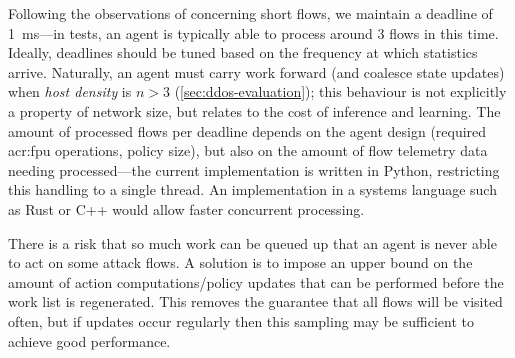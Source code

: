 Following the observations of \Textcite{DBLP:conf/sigcomm/ChenL0L18} concerning short flows, we maintain a deadline of \qty{1}{\milli\second}---in tests, an agent is typically able to process around \num{3} flows in this time.
Ideally, deadlines should be tuned based on the frequency at which statistics arrive.
Naturally, an agent must carry work forward (and coalesce state updates) when \emph{host density} is $n>3$ (\cref{sec:ddos-evaluation}); this behaviour is not explicitly a property of network size, but relates to the cost of inference and learning.
The amount of processed flows per deadline depends on the agent design (required \gls{acr:fpu} operations, policy size), but also on the amount of flow telemetry data needing processed---the current implementation is written in Python, restricting this handling to a single thread.
An implementation in a systems language such as Rust or C++ would allow faster concurrent processing.

There is a risk that so much work can be queued up that an agent is never able to act on some attack flows.
A solution is to impose an upper bound on the amount of action computations/policy updates that can be performed before the work list is regenerated.
This removes the guarantee that all flows will be visited often, but if updates occur regularly then this sampling may be sufficient to achieve good performance.